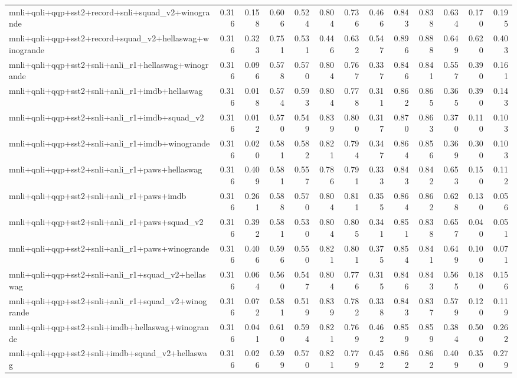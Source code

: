 \begin{table}[t]
\begin{tabular}{lrrrrrrrrrrrr}
    mnli+qnli+qqp+sst2+record+snli+squad\_v2+winogrande & 0.316 & 0.158 & 0.606 & 0.524 & 0.804 & 0.736 & 0.466 & 0.843 & 0.838 & 0.634 & 0.170 & 0.195 \\
    mnli+qnli+qqp+sst2+record+squad\_v2+hellaswag+winogrande & 0.316 & 0.323 & 0.751 & 0.531 & 0.446 & 0.632 & 0.547 & 0.896 & 0.888 & 0.649 & 0.620 & 0.403 \\
    mnli+qnli+qqp+sst2+snli+anli\_r1+hellaswag+winogrande & 0.316 & 0.096 & 0.578 & 0.570 & 0.804 & 0.767 & 0.337 & 0.846 & 0.841 & 0.557 & 0.390 & 0.161 \\
    mnli+qnli+qqp+sst2+snli+anli\_r1+imdb+hellaswag & 0.316 & 0.018 & 0.574 & 0.593 & 0.804 & 0.778 & 0.311 & 0.862 & 0.865 & 0.365 & 0.390 & 0.143 \\
    mnli+qnli+qqp+sst2+snli+anli\_r1+imdb+squad\_v2 & 0.316 & 0.012 & 0.570 & 0.549 & 0.839 & 0.800 & 0.317 & 0.870 & 0.863 & 0.370 & 0.110 & 0.103 \\
    mnli+qnli+qqp+sst2+snli+anli\_r1+imdb+winogrande & 0.316 & 0.020 & 0.581 & 0.582 & 0.821 & 0.794 & 0.347 & 0.864 & 0.856 & 0.369 & 0.300 & 0.103 \\
    mnli+qnli+qqp+sst2+snli+anli\_r1+paws+hellaswag & 0.316 & 0.409 & 0.581 & 0.557 & 0.786 & 0.791 & 0.333 & 0.843 & 0.842 & 0.653 & 0.150 & 0.112 \\
    mnli+qnli+qqp+sst2+snli+anli\_r1+paws+imdb & 0.316 & 0.261 & 0.588 & 0.570 & 0.804 & 0.811 & 0.355 & 0.864 & 0.862 & 0.628 & 0.130 & 0.056 \\
    mnli+qnli+qqp+sst2+snli+anli\_r1+paws+squad\_v2 & 0.316 & 0.392 & 0.581 & 0.530 & 0.804 & 0.805 & 0.341 & 0.851 & 0.838 & 0.657 & 0.040 & 0.051 \\
    mnli+qnli+qqp+sst2+snli+anli\_r1+paws+winogrande & 0.316 & 0.406 & 0.596 & 0.550 & 0.821 & 0.801 & 0.375 & 0.854 & 0.841 & 0.649 & 0.100 & 0.071 \\
    mnli+qnli+qqp+sst2+snli+anli\_r1+squad\_v2+hellaswag & 0.316 & 0.064 & 0.560 & 0.547 & 0.804 & 0.776 & 0.315 & 0.846 & 0.843 & 0.565 & 0.180 & 0.156 \\
    mnli+qnli+qqp+sst2+snli+anli\_r1+squad\_v2+winogrande & 0.316 & 0.072 & 0.581 & 0.519 & 0.839 & 0.782 & 0.338 & 0.843 & 0.837 & 0.579 & 0.120 & 0.119 \\
    mnli+qnli+qqp+sst2+snli+imdb+hellaswag+winogrande & 0.316 & 0.041 & 0.610 & 0.594 & 0.821 & 0.769 & 0.462 & 0.859 & 0.859 & 0.384 & 0.500 & 0.262 \\
    mnli+qnli+qqp+sst2+snli+imdb+squad\_v2+hellaswag & 0.316 & 0.026 & 0.599 & 0.570 & 0.821 & 0.779 & 0.452 & 0.862 & 0.862 & 0.409 & 0.350 & 0.279 \\

\end{tabular}
\end{table}
